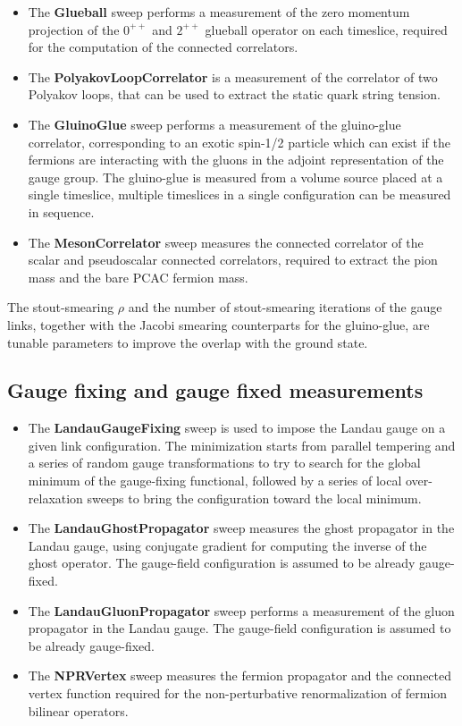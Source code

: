 \documentclass[11pt,a4paper]{article}
\begin{document}
\begin{itemize}
\item The \textbf{Glueball} sweep performs a measurement of the zero momentum projection of the $0^{++}$ and $2^{++}$ glueball operator on each timeslice, required for the computation of the connected correlators.
\item The \textbf{PolyakovLoopCorrelator} is a measurement of the correlator of two Polyakov loops, that can be used to extract the static quark string tension.
\item The \textbf{GluinoGlue} sweep performs a measurement of the gluino-glue correlator, corresponding to an exotic spin-1/2 particle which can exist if the fermions are interacting with the gluons in the adjoint representation of the gauge group. The gluino-glue is measured from a volume source placed at a single timeslice, multiple timeslices in a single configuration can be measured in sequence.
\item The \textbf{MesonCorrelator} sweep measures the connected correlator of the scalar and pseudoscalar connected correlators, required to extract the pion mass and the bare PCAC fermion mass.
\end{itemize}

The stout-smearing $\rho$ and the number of stout-smearing iterations of the gauge links, together with the Jacobi smearing counterparts for the gluino-glue, are tunable parameters to improve the overlap with the ground state.

\subsection{Gauge fixing and gauge fixed measurements}

\begin{itemize}
\item The \textbf{LandauGaugeFixing} sweep is used to impose the Landau gauge on a given link configuration. The minimization starts from parallel tempering and a series of random gauge transformations to try to search for the global minimum of the gauge-fixing functional, followed by a series of local over-relaxation sweeps to bring the configuration toward the local minimum.
\item The \textbf{LandauGhostPropagator} sweep measures the ghost propagator in the Landau gauge, using conjugate gradient for computing the inverse of the ghost operator. The gauge-field configuration is assumed to be already gauge-fixed. 
\item The \textbf{LandauGluonPropagator} sweep performs a measurement of the gluon propagator in the Landau gauge. The gauge-field configuration is assumed to be already gauge-fixed.
\item The \textbf{NPRVertex} sweep measures the fermion propagator and the connected vertex function required for the non-perturbative renormalization of fermion bilinear operators.
\end{itemize}
\end{document}

